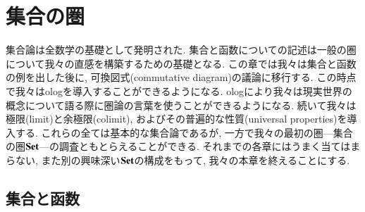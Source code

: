 



\chapter{集合の圏}\label{chap:sets}


集合論は全数学の基礎として発明された. 集合と函数についての記述は一般の圏について我々の直感を構築するための基礎となる. この章では我々は集合と函数の例を出した後に, 可換図式(commutative diagram)の議論に移行する. この時点で我々はologを導入することができるようになる. ologにより我々は現実世界の概念について語る際に圏論の言葉を使うことができるようになる. 続いて我々は極限(limit)と余極限(colimit), およびその普遍的な性質(universal properties)を導入する. これらの全ては基本的な集合論であるが, 一方で我々の最初の圏---集合の圏${\bf Set}$---の調査ともとらえることができる.
%
それまでの各章にはうまく当てはまらない, また別の興味深い${\bf Set}$の構成をもって, 我々の本章を終えることにする.



\section{集合と函数} 

